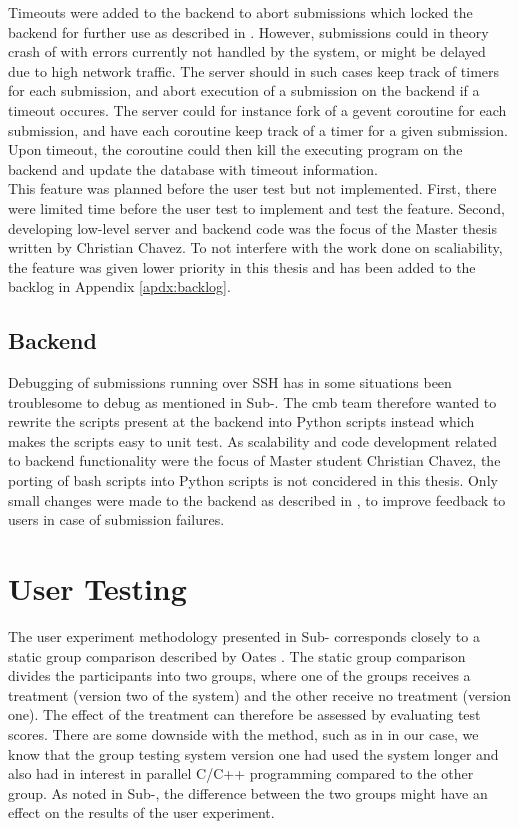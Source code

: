 Timeouts were added to the backend to abort submissions which locked the backend for further use as described in . However, submissions could in theory crash of with errors currently not handled by the system, or might be delayed due to high network traffic. The server should in such cases keep track of timers for each submission, and abort execution of a submission on the backend if a timeout occures. The server could for instance fork of a gevent coroutine for each submission, and have each coroutine keep track of a timer for a given submission. Upon timeout, the coroutine could then kill the executing program on the backend and update the database with timeout information. \\

This feature was planned before the user test but not implemented. First, there were limited time before the user test to implement and test the feature. Second, developing low-level server and backend code was the focus of the Master thesis written by Christian Chavez. To not interfere with the work done on scaliability, the feature was given lower priority in this thesis and has been added to the backlog in Appendix \ref{apdx:backlog}.

\subsection{Backend}
Debugging of submissions running over SSH has in some situations been troublesome to debug as mentioned in Sub-. The \gls{cmb} team therefore wanted to rewrite the scripts present at the backend into Python scripts instead which makes the scripts easy to unit test. As scalability and code development related to backend functionality were the focus of Master student Christian Chavez, the porting of bash scripts into Python scripts is not concidered in this thesis. Only small changes were made to the backend as described in , to improve feedback to users in case of submission failures.

\section{User Testing}
\label{sec:eval-user-testing}
The user experiment methodology presented in Sub- corresponds closely to a static group comparison described by Oates \cite{Oates2006}. The static group comparison divides the participants into two groups, where one of the groups receives a treatment (version two of the system) and the other receive no treatment (version one). The effect of the treatment can therefore be assessed by evaluating test scores. There are some downside with the method, such as in in our case, we know that the group testing system version one had used the system longer and also had in interest in parallel C/C++ programming compared to the other group. As noted in Sub-, the difference between the two groups might have an effect on the results of the user experiment. \\

